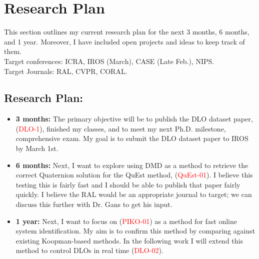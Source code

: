\documentclass[11pt]{article}
\begin{document}
\section{Research Plan}
This section outlines my current research plan for the next 3 months, 6 months,
and 1 year. Moreover, I have included open projects and ideas to keep track of
them.\\
Target conferences: ICRA, IROS (March), CASE (Late Feb.), NIPS.\\
Target Journals: RAL, CVPR, CORAL.\\

\subsection{Research Plan:}
\begin{itemize}
  \item \textbf{3 months:} The primary objective will be to publish the DLO dataset paper,
  (\textcolor{red}{DLO-1}),
  finished my classes, and to meet my next Ph.D. milestone, comprehensive exam.
  My goal is to submit the DLO dataset paper to IROS by March 1st.\
  \item \textbf{6 months:} Next, I want to explore using DMD as a method to retrieve the
  correct Quaternion solution for the QuEst method, (\textcolor{red}{QuEst-01}).
  I believe this testing this
  is fairly fast and I should be able to publish that paper fairly quickly. I
  believe the RAL would be an appropriate journal to target; we can discuss
  this further with Dr. Gans to get his input.\
  \item \textbf{1 year:} Next, I want to focus on (\textcolor{red}{PIKO-01}) as a method
  for fast online system identification. My aim is to confirm this method by
  comparing against existing Koopman-based methods. In the following work I
  will extend this method to control DLOs in real time (\textcolor{red}{DLO-02}).\
\end{itemize}
\end{document}
